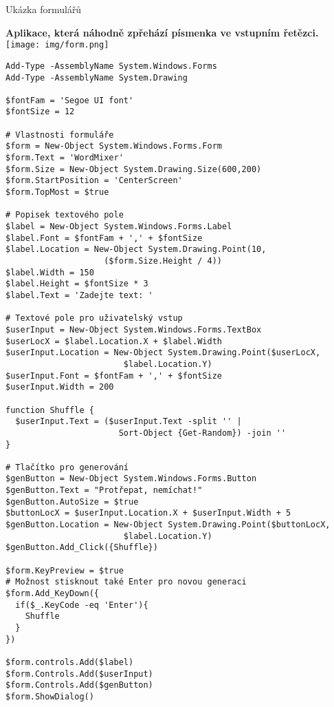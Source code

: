 \documentclass[main.tex]{subfiles}
\begin{document}
\begin{frame}{Ukázka formulářů}
  \begin{center}
    \textbf{Aplikace, která náhodně zpřehází písmenka ve vstupním řetězci.}\\
  \vspace{3mm}
  \texttt{[image: img/form.png]}
  \end{center}
\begin{verbatim}
Add-Type -AssemblyName System.Windows.Forms
Add-Type -AssemblyName System.Drawing

$fontFam = 'Segoe UI font'
$fontSize = 12

# Vlastnosti formuláře
$form = New-Object System.Windows.Forms.Form
$form.Text = 'WordMixer'
$form.Size = New-Object System.Drawing.Size(600,200)
$form.StartPosition = 'CenterScreen'
$form.TopMost = $true

# Popisek textového pole
$label = New-Object System.Windows.Forms.Label
$label.Font = $fontFam + ',' + $fontSize
$label.Location = New-Object System.Drawing.Point(10,
                    ($form.Size.Height / 4))
$label.Width = 150
$label.Height = $fontSize * 3
$label.Text = 'Zadejte text: '

# Textové pole pro uživatelský vstup
$userInput = New-Object System.Windows.Forms.TextBox
$userLocX = $label.Location.X + $label.Width
$userInput.Location = New-Object System.Drawing.Point($userLocX,
                        $label.Location.Y)
$userInput.Font = $fontFam + ',' + $fontSize
$userInput.Width = 200

function Shuffle {
  $userInput.Text = ($userInput.Text -split '' |
                       Sort-Object {Get-Random}) -join ''
}

# Tlačítko pro generování
$genButton = New-Object System.Windows.Forms.Button
$genButton.Text = "Protřepat, nemíchat!"
$genButton.AutoSize = $true
$buttonLocX = $userInput.Location.X + $userInput.Width + 5
$genButton.Location = New-Object System.Drawing.Point($buttonLocX,
                        $label.Location.Y)
$genButton.Add_Click({Shuffle})

$form.KeyPreview = $true
# Možnost stisknout také Enter pro novou generaci
$form.Add_KeyDown({
  if($_.KeyCode -eq 'Enter'){
    Shuffle
  }
})

$form.controls.Add($label)
$form.Controls.Add($userInput)
$form.Controls.Add($genButton)
$form.ShowDialog()
\end{verbatim}
\end{frame}
\end{document}
